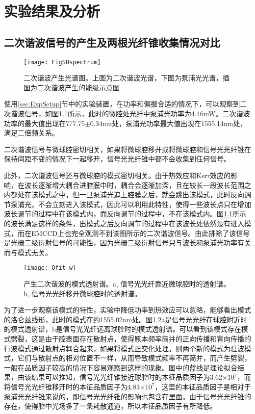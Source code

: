 \chapter{实验结果及分析}
\label{sec:measurement}

\section{二次谐波信号的产生及两根光纤锥收集情况对比}

\begin{figure}
\centering
\texttt{[image: FigSHspectrum]}
\caption{二次谐波产生光谱图。上图为二次谐波光谱，下图为泵浦光光谱，插图为二次谐波产生的能级示意图}
\label{pic:FigSHspectrum}
\end{figure}

使用\ref{sec:ExpSetup}节中的实验装置，在功率和偏振合适的情况下，可以观察到二次谐波信号，如图\ref{pic:FigSHspectrum}所示，此时的微腔处光纤中泵浦光功率为4.46mW。二次谐波功率的最大值出现在777.75$\pm0.34$nm处，泵浦光功率最大值出现在1555.14nm处，满足二倍频关系。


二次谐波信号与微球腔密切相关，如果将微球腔移开或将微球腔和信号光光纤锥在保持间距不变的情况下一起移开，信号光光纤锥中都不会收集到任何信号。

此外，二次谐波信号还与微球腔的模式密切相关。由于热效应和Kerr效应的影响，在波长逐渐增大耦合进腔膜中时，耦合会逐渐加深，且在较长一段波长范围之内都处在该模式之中，但一旦泵浦光追上腔膜之后，就会跳出该模式，此时反向调节泵浦光，不会立刻进入该模式\cite{carmon2004dynamical}，因此可以利用此特性，使得一些波长点只在增加波长调节的过程中在该模式内，而反向调节的过程中，不在该模式内。图\ref{pic:FigSHspectrum}所示的波长满足这样的条件，出模式之后反向调节的过程中在该波长处依然没有进入模式，而在EMCCD上也完全观测不到该图所示的二次谐波信号。由此排除了该信号是光栅二级衍射信号的可能性，因为光栅二级衍射信号只与波长和泵浦光功率有关而与模式无关。

\begin{figure}
\centering
\texttt{[image: Qfit\_w]}
\caption{产生二次谐波的模式透射谱。a, 信号光光纤靠近微球腔时的透射谱。b, 信号光光纤移开微球腔时的透射谱。}
\label{pic:Qfit_w}
\end{figure}

为了进一步观察该模式的特性，实验中降低功率到热效应可以忽略，能够看出模式的洛仑兹线形，此时的模式在约1555.02nm处。图\ref{pic:Qfit_w}a是信号光光纤在球腔附近时的模式透射谱，b是信号光光纤远离球腔时的模式透射谱。可以看到该模式存在模式劈裂，这是由于腔表面存在散射点，使得原本频率简并的正向传播和背向传播的行波模式通过散射点耦合起来，如果将模式正交化处理，则两个新的模式为驻波模式，它们与散射点的相对位置不一样，从而导致模式频率不再简并，而产生劈裂\cite{cao2017experimental}，一般在品质因子较高的情况下容易观察到这样的现象。图中的蓝线是理论拟合结果，由该结果可以推知，信号光光纤锥接近球腔时的本征品质因子为3.62$\times 10^7$，而将信号光光纤锥移开时的本征品质因子为4.83$\times 10^7$，这里的本征品质因子是相对于泵浦光光纤锥来说的，即信号光光纤锥的影响也包含在里面。由于信号光光纤锥的存在，使得腔中光场多了一条耗散通道，所以本征品质因子有所降低。

